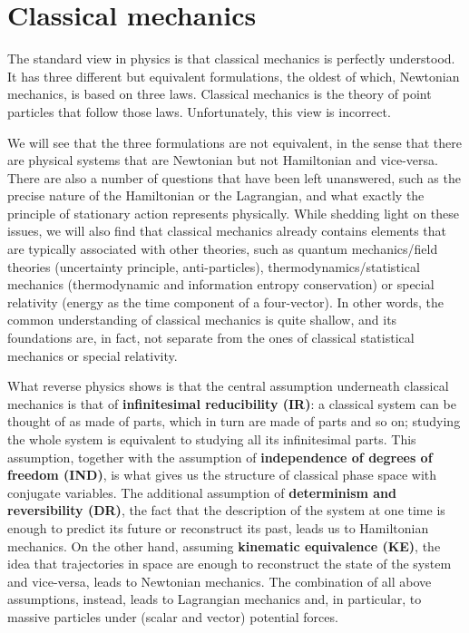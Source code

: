 \newcommand{\eqtext}[2][4.5in]{\parbox{#1}{#2}}

\chapter{Classical mechanics}

The standard view in physics is that classical mechanics is perfectly understood. It has three different but equivalent formulations, the oldest of which, Newtonian mechanics, is based on three laws. Classical mechanics is the theory of point particles that follow those laws. Unfortunately, this view is incorrect.

We will see that the three formulations are not equivalent, in the sense that there are physical systems that are Newtonian but not Hamiltonian and vice-versa. There are also a number of questions that have been left unanswered, such as the precise nature of the Hamiltonian or the Lagrangian, and what exactly the principle of stationary action represents physically. While shedding light on these issues, we will also find that classical mechanics already contains elements that are typically associated with other theories, such as quantum mechanics/field theories (uncertainty principle, anti-particles), thermodynamics/statistical mechanics (thermodynamic and information entropy conservation) or special relativity (energy as the time component of a four-vector). In other words, the common understanding of classical mechanics is quite shallow, and its foundations are, in fact, not separate from the ones of classical statistical mechanics or special relativity.

What reverse physics shows is that the central assumption underneath classical mechanics is that of \textbf{infinitesimal reducibility (IR)}: a classical system can be thought of as made of parts, which in turn are made of parts and so on; studying the whole system is equivalent to studying all its infinitesimal parts. This assumption, together with the assumption of \textbf{independence of degrees of freedom (IND)}, is what gives us the structure of classical phase space with conjugate variables. The additional assumption of \textbf{determinism and reversibility (DR)}, the fact that the description of the system at one time is enough to predict its future or reconstruct its past, leads us to Hamiltonian mechanics. On the other hand, assuming \textbf{kinematic equivalence (KE)}, the idea that trajectories in space are enough to reconstruct the state of the system and vice-versa, leads to Newtonian mechanics. The combination of all above assumptions, instead, leads to Lagrangian mechanics and, in particular, to massive particles under (scalar and vector) potential forces.

